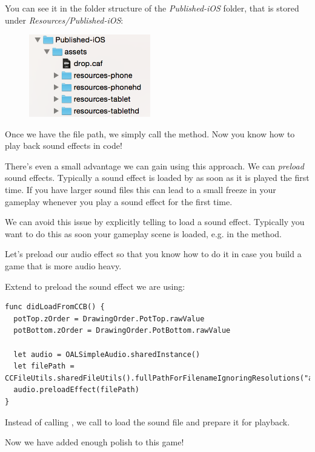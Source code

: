 You can see it in the folder structure of the \textit{Published-iOS} folder,
that is stored under \textit{Resources/Published-iOS}:
  \begin{figure}[H]
  \centering
  \includegraphics[width=150pt]{images/Chapter9/resource_structure.png}
  \end{figure}

Once we have the file path, we simply call the  method.
Now you know how to play back sound effects in code!

There's even a small advantage we can gain using this approach. We can
\textit{preload} sound effects. Typically a sound effect is loaded by
 as soon as it is played the first time. If you have larger
sound files this can lead to a small freeze in your gameplay whenever you play a
sound effect for the first time.

We can avoid this issue by explicitly telling  to load a
sound effect. Typically you want to do this as soon your gameplay scene is
loaded, e.g. in the  method.

Let's preload our audio effect so that you know how to do it in case you build a
game that is more audio heavy.

\begin{leftbar}
Extend  to preload the sound effect we are using:
\begin{lstlisting}
func didLoadFromCCB() {
  potTop.zOrder = DrawingOrder.PotTop.rawValue
  potBottom.zOrder = DrawingOrder.PotBottom.rawValue
  
  let audio = OALSimpleAudio.sharedInstance()
  let filePath = CCFileUtils.sharedFileUtils().fullPathForFilenameIgnoringResolutions("assets/drop.caf")
  audio.preloadEffect(filePath)
}
\end{lstlisting}
\end{leftbar}

Instead of calling , we call 
to load the sound file and prepare it for playback.

Now we have added enough polish to this game!
